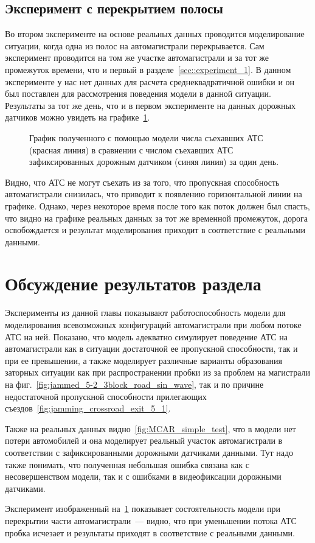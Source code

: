 \subsection{Эксперимент с перекрытием полосы}
\label{sec::experiment_2}
Во втором эксперименте на основе реальных данных проводится моделирование ситуации, когда одна из полос на автомагистрали перекрывается.
Сам эксперимент проводится на том же участке автомагистрали и за тот же промежуток времени, что и первый в разделе~\ref{sec::experiment_1}.
В данном эксперименте у нас нет данных для расчета среднеквадратичной ошибки и он был поставлен для рассмотрения поведения модели в данной ситуации.
Результаты за тот же день, что и в первом эксперименте на данных дорожных датчиков можно увидеть на графике~\ref{fig:MCAR_minus_road_test}.
\begin{figure}[ht]
    \caption{График полученного с помощью модели числа съехавших АТС (красная линия) в сравнении с числом съехавших АТС зафиксированных дорожным датчиком (синяя линия) за один день.}
    \label{fig:MCAR_minus_road_test}
\end{figure}

Видно, что АТС не могут съехать из за того, что пропускная способность автомагистрали снизилась, что приводит к появлению горизонтальной линии на графике.
Однако, через некоторое время после того как поток должен был спасть, что видно на графике реальных данных за тот же временной промежуток, дорога освобождается и результат моделирования приходит в соответствие с реальными данными.

\section{Обсуждение результатов раздела}
Эксперименты из данной главы показывают работоспособность модели для моделирования всевозможных конфигураций автомагистрали при любом потоке АТС на ней.
Показано, что модель адекватно симулирует поведение АТС на автомагистрали как в ситуации достаточной ее пропускной способности, так и при ее превышении, а также моделирует различные варианты образования заторных ситуации как при распространении пробки из за проблем на магистрали на фиг.~\ref{fig:jammed_5-2_3block_road_sin_wave}, так и по причине недостаточной пропускной способности прилегающих съездов~\ref{fig:jamming_crossroad_exit_5_1}.

Также на реальных данных видно~\ref{fig:MCAR_simple_test}, что в модели нет потери автомобилей и она моделирует реальный участок автомагистрали в соответствии с зафиксированными дорожными датчиками данными.
Тут надо также понимать, что полученная небольшая ошибка связана как с несовершенством модели, так и с ошибками в видеофиксации дорожными датчиками.

Эксперимент изображенный на~\ref{fig:MCAR_minus_road_test} показывает состоятельность модели при перекрытии части автомагистрали~--- видно, что при уменьшении потока АТС пробка исчезает и результаты приходят в соответствие с реальными данными.

\FloatBarrier 